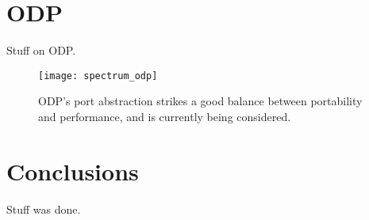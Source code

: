 \section{ODP}
\label{hardware:odp}
Stuff on ODP.

\begin{figure}[h]
  \centering
  \texttt{[image: spectrum\_odp]}
  \caption{ODP's port abstraction strikes a good balance between portability
  and performance, and is currently being considered.}
  \label{hardware:spectrum_odp}
\end{figure}

\section{Conclusions}
\label{hardware:concl}
Stuff was done.
